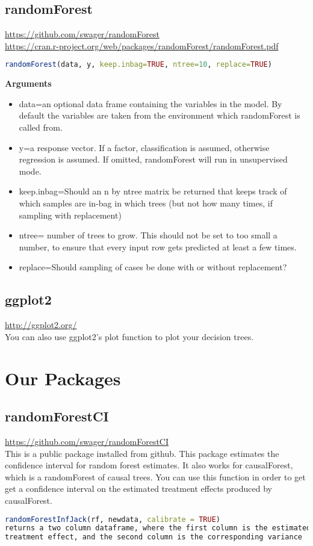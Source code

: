 \documentclass{article}
\begin{document}
\subsection{randomForest}
\url{https://github.com/swager/randomForest} \\
\url{https://cran.r-project.org/web/packages/randomForest/randomForest.pdf}

\begin{lstlisting}[language=R]
randomForest(data, y, keep.inbag=TRUE, ntree=10, replace=TRUE)
\end{lstlisting}
\textbf{Arguments} \\
\begin{itemize}
  \item data=an optional data frame containing the variables in the model. By default the variables are taken from the environment which randomForest is called from.
  \item y=a response vector. If a factor, classification is assumed, otherwise regression is assumed. If omitted, randomForest will run in unsupervised mode.
  \item keep.inbag=Should an n by ntree matrix be returned that keeps track of which samples are in-bag in which trees (but not how many times, if sampling with replacement)
  \item ntree= number of trees to grow. This should not be set to too small a number, to ensure that every input row gets predicted at least a few times.
  \item replace=Should sampling of cases be done with or without replacement?
\end{itemize}

 \subsection{ggplot2}\url{http://ggplot2.org/}\\
 You can also use ggplot2's plot function to plot your decision trees. 
 \section{Our Packages}
 \subsection{randomForestCI}
 	\url{https://github.com/swager/randomForestCI} \\
This is a public package installed from github. 
This package estimates the confidence interval for random forest estimates. 
It also works for causalForest, which is a randomForest of causal trees. You can use this function in order to get get a confidence interval on the estimated treatment effects produced by causalForest. 
\begin{lstlisting}[language=R]
randomForestInfJack(rf, newdata, calibrate = TRUE)
returns a two column dataframe, where the first column is the estimated 
treatment effect, and the second column is the corresponding variance
\end{lstlisting}
\end{document}
